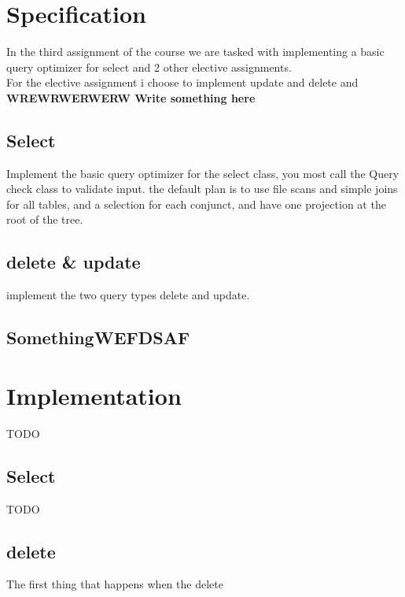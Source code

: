 \documentclass[a4paper,10pt,titlepage]{report}
\begin{document}
\section{Specification}
In the third assignment of the course we are tasked with implementing a basic query optimizer for select and 2 other elective assignments.\\

For the elective assignment i choose to implement update and delete and \textbf{WREWRWERWERW Write something here}


\subsection{Select}
Implement the basic query optimizer for the select class, you most call the Query check class to validate input. the default plan is to use file scans and simple joins for all tables, and a selection for each conjunct, and have one projection at the root of the tree.

\subsection{delete \& update }

implement the two query types delete and update.

\subsection{SomethingWEFDSAF}



%

\section{Implementation}
TODO

\subsection{Select}

TODO
\subsection{delete}
The first thing that happens when the delete 
\end{document}
